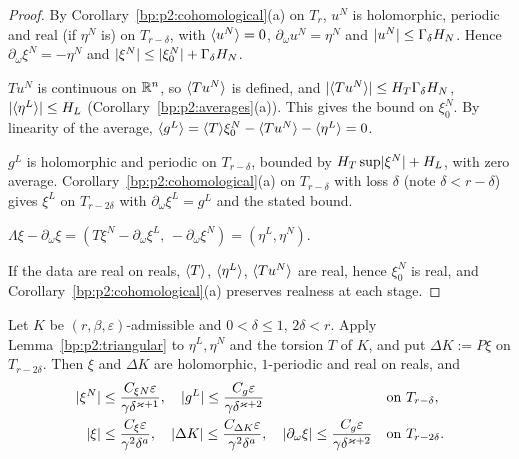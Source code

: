 \begin{proof}
\label{step:p2:tri-first}
By Corollary~\ref{bp:p2:cohomological}(a) on $T_r$, $u^N$ is holomorphic, periodic and real (if $\eta^N$
is) on $T_{r-\delta}$, with $\langle u^N\rangle=0$, $\partial_\omega u^N=\eta^N$ and $\lvert u^N\rvert\le\Gamma_\delta
H_N$. Hence $\partial_\omega\xi^N=-\eta^N$ and $\lvert \xi^N\rvert\le\lvert \xi^N_0\rvert+\Gamma_\delta H_N$.

\label{step:p2:tri-xi0}
$Tu^N$ is continuous on $\mathbb{R}^n$, so $\langle Tu^N\rangle$ is defined, and $\lvert \langle Tu^N\rangle\rvert\le H_T\Gamma_\delta
H_N$, $\lvert \langle \eta^L\rangle\rvert\le H_L$ (Corollary~\ref{bp:p2:averages}(a)). This gives the bound on
$\xi^N_0$. By linearity of the average, $\langle g^L\rangle=\langle T\rangle\xi^N_0-\langle Tu^N\rangle-\langle \eta^L\rangle=0$.

\label{step:p2:tri-second}
$g^L$ is holomorphic and periodic on $T_{r-\delta}$, bounded by $H_T\sup\lvert \xi^N\rvert+H_L$, with zero
average. Corollary~\ref{bp:p2:cohomological}(a) on $T_{r-\delta}$ with loss $\delta$ (note $\delta<r-\delta$)
gives $\xi^L$ on $T_{r-2\delta}$ with $\partial_\omega\xi^L=g^L$ and the stated bound.

\label{step:p2:tri-form}
$\Lambda\xi-\partial_\omega\xi=(T\xi^N-\partial_\omega\xi^L,\,-\partial_\omega\xi^N)=(\eta^L,\eta^N)$.

\label{step:p2:tri-real}
If the data are real on reals, $\langle T\rangle$, $\langle \eta^L\rangle$, $\langle Tu^N\rangle$ are real, hence $\xi^N_0$ is real,
and Corollary~\ref{bp:p2:cohomological}(a) preserves realness at each stage.
\end{proof}

\begin{lemma}\label{bp:p2:correction}
Let $K$ be $(r,\beta,\varepsilon)$-admissible and $0<\delta\le1$, $2\delta<r$. Apply
Lemma~\ref{bp:p2:triangular} to $\eta^L,\eta^N$ and the torsion $T$ of $K$, and put $\Delta K:=P\xi$ on
$T_{r-2\delta}$. Then $\xi$ and $\Delta K$ are holomorphic, $1$-periodic and real on reals, and
\begin{align*}
\lvert \xi^N\rvert&\le\frac{C_{\xi N}\varepsilon}{\gamma\delta^{\varkappa+1}},\quad
\lvert g^L\rvert\le\frac{C_g\varepsilon}{\gamma\delta^{\varkappa+2}}&&\text{on }T_{r-\delta},\\
\lvert \xi\rvert&\le\frac{C_\xi\varepsilon}{\gamma^2\delta^a},\quad
\lvert \Delta K\rvert\le\frac{C_{\Delta K}\varepsilon}{\gamma^2\delta^a},\quad
\lvert \partial_\omega\xi\rvert\le\frac{C_g\varepsilon}{\gamma\delta^{\varkappa+2}}&&\text{on }T_{r-2\delta}.
\end{align*}
\end{lemma}

